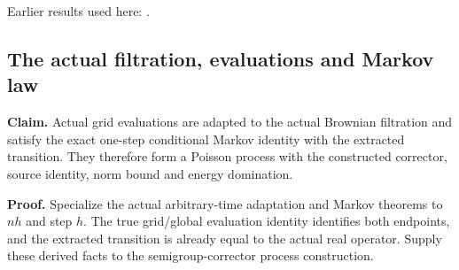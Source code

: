 \documentclass[11pt,a4paper]{report}
\begin{document}
Earlier results used here: \cite[Section~3.26.3]{LangevinLean2026ULASC}.
\subsection{\texorpdfstring{The actual filtration, evaluations and Markov law}{The actual filtration, evaluations and Markov law}}
\label{report-step-WassersteinMixing-ActualPoisson-lean-2}


\textbf{Claim.} Actual grid evaluations are adapted to the actual Brownian filtration and satisfy the exact one-step conditional Markov identity with the extracted transition. They therefore form a Poisson process with the constructed corrector, source identity, norm bound and energy domination.



\textbf{Proof.} Specialize the actual arbitrary-time adaptation and Markov theorems to \(nh\) and step \(h\). The true grid/\allowbreak{}global evaluation identity identifies both endpoints, and the extracted transition is already equal to the actual real operator. Supply these derived facts to the semigroup-corrector process construction.
\end{document}

